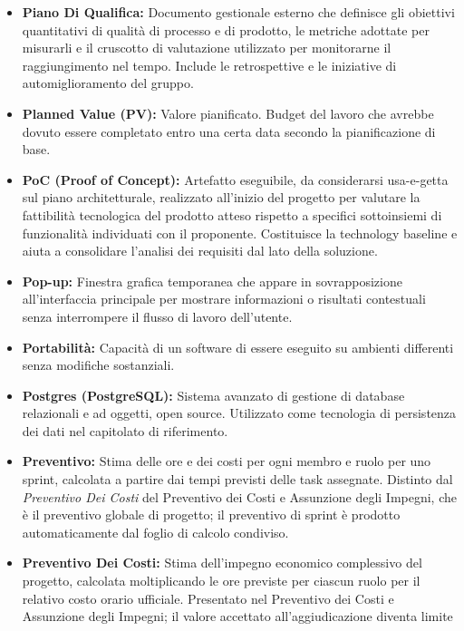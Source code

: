 \begin{itemize}[leftmargin=*]
      \item \textbf{Piano Di Qualifica:} Documento gestionale esterno che definisce
      gli obiettivi quantitativi di qualità di processo e di prodotto, le
      metriche adottate per misurarli e il cruscotto di valutazione utilizzato
      per monitorarne il raggiungimento nel tempo. Include le retrospettive
      e le iniziative di automiglioramento del gruppo.
      \item \textbf{Planned Value (PV):} Valore pianificato. 
      Budget del lavoro che avrebbe dovuto essere completato entro una certa data 
      secondo la pianificazione di base.
      \item \textbf{PoC (Proof of Concept):} Artefatto eseguibile, da considerarsi
          usa-e-getta sul piano architetturale, realizzato all'inizio del progetto
          per valutare la fattibilità tecnologica del prodotto atteso rispetto a
          specifici sottoinsiemi di funzionalità individuati con il proponente.
          Costituisce la technology baseline e aiuta a consolidare l'analisi dei
          requisiti dal lato della soluzione.
      \item \textbf{Pop-up:} Finestra grafica temporanea che appare in sovrapposizione all'interfaccia principale per mostrare informazioni o risultati contestuali senza interrompere il flusso di lavoro dell'utente.
      \item \textbf{Portabilità:} Capacità di un software di essere eseguito su ambienti differenti senza modifiche sostanziali.
      \item \textbf{Postgres (PostgreSQL):} Sistema avanzato di gestione di database
          relazionali e ad oggetti, open source. Utilizzato come tecnologia di
          persistenza dei dati nel capitolato di riferimento.
      \item \textbf{Preventivo:} Stima delle ore e dei costi per ogni membro e ruolo
            per uno sprint, calcolata a partire dai tempi previsti delle task assegnate.
            Distinto dal \textit{Preventivo Dei Costi} del Preventivo dei Costi e Assunzione degli Impegni,
            che è il preventivo globale di progetto; il preventivo di sprint è prodotto
            automaticamente dal foglio di calcolo condiviso.
      \item \textbf{Preventivo Dei Costi:} Stima dell'impegno economico complessivo
            del progetto, calcolata moltiplicando le ore previste per ciascun ruolo
            per il relativo costo orario ufficiale. Presentato nel Preventivo dei Costi e Assunzione degli Impegni; il valore accettato all'aggiudicazione diventa limite

\end{itemize}
